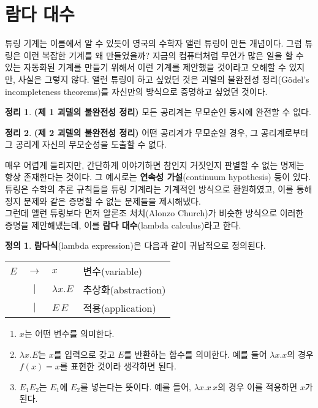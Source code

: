 \documentclass[b5paper]{book}
\theoremstyle{definition}
\newtheorem{defn}{정의}[chapter]
\newtheorem{thm}{정리}[chapter]
\begin{document}
\section{람다 대수} \label{lambda calculus}
튜링 기계는 이름에서 알 수 있듯이 영국의 수학자 앨런 튜링이 만든 개념이다. 그럼 튜링은 이런 복잡한 기계를
왜 만들었을까? 지금의 컴퓨터처럼 무언가 많은 일을 할 수 있는 자동화된 기계를 만들기 위해서 이런 기계를 
제안했을 것이라고 오해할 수 있지만, 사실은 그렇지 않다. 앨런 튜링이 하고 싶었던 것은 괴델의 불완전성 
정리(Gödel’s incompleteness theorems)를 자신만의 방식으로 증명하고 싶었던 것이다.
\begin{thm}
    \textbf{(제 1 괴델의 불완전성 정리)} 모든 공리계는 무모순인 동시에 완전할 수 없다.
\end{thm}
\begin{thm}
    \textbf{(제 2 괴델의 불완전성 정리)} 어떤 공리계가 무모순일 경우, 그 공리계로부터 그 공리계 자신의
    무모순성을 도출할 수 없다. 
\end{thm}
매우 어렵게 들리지만, 간단하게 이야기하면 참인지 거짓인지 판별할 수 없는 명제는 항상 존재한다는 것이다. 그
예시로는 \textbf{연속성 가설}(continuum hypothesis) 등이 있다. 튜링은 수학의 추론 규칙들을 튜링 기계라는
기계적인 방식으로 환원하였고, 이를 통해 정지 문제와 같은 증명할 수 없는 문제들을 제시해냈다. \\
그런데 앨런 튜링보다 먼저 알론조 처치(Alonzo Church)가 비슷한 방식으로 이러한 증명을 제안해냈는데, 이를 
\textbf{람다 대수}(lambda calculus)라고 한다. 
\begin{defn}
    \textbf{람다식}(lambda expression)은 다음과 같이 귀납적으로 정의된다.
    \begin{center}
        \begin{tabular}{ccll}
            $E$ & $\rightarrow$ & $x$ & 변수(variable) \\ 
            & $\vert$ & $\lambda x . E$ & 추상화(abstraction) \\ 
            & $\vert$ & $E \, E$ & 적용(application)
        \end{tabular}    
    \end{center}
    \begin{enumerate}
        \item $x$는 어떤 변수를 의미한다.
        \item $\lambda x. E$는 $x$를 입력으로 갖고 $E$를 반환하는 함수를 의미한다. 예를 들어
        $\lambda x . x$의 경우 $f(x) = x$를 표현한 것이라 생각하면 된다.
        \item $E_1 E_2$는 $E_1$에 $E_2$를 넣는다는 뜻이다. 예를 들어, $\lambda x. x \, x$의 경우
        이를 적용하면 $x$가 된다.
    \end{enumerate} 
\end{defn}
\end{document}
